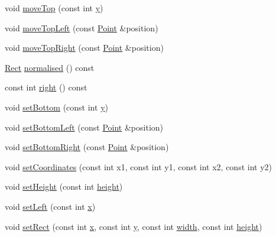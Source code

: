 \begin{DoxyCompactItemize}
\item 
void \hyperlink{classprism_1_1_rect_a1b1e4d524a29d32eab8c0938b6ae5246}{move\+Top} (const int \hyperlink{classprism_1_1_rect_a6e951744e0bba0fed781b86ab0be680b}{y})
\item 
void \hyperlink{classprism_1_1_rect_ae0ccad0d81dbda985be4e9ee8ae3f6f7}{move\+Top\+Left} (const \hyperlink{classprism_1_1_point}{Point} \&position)
\item 
void \hyperlink{classprism_1_1_rect_a24bdcf4de55d61b8c41010a8614203a7}{move\+Top\+Right} (const \hyperlink{classprism_1_1_point}{Point} \&position)
\item 
\hyperlink{classprism_1_1_rect}{Rect} \hyperlink{classprism_1_1_rect_ab08d9dbc02f86349530e0a2b6f6d05d6}{normalised} () const 
\item 
const int \hyperlink{classprism_1_1_rect_abf19c427e016b65d28118b8330de62d1}{right} () const 
\item 
void \hyperlink{classprism_1_1_rect_ac9d82a69be0dba946f8f9421aa33fffe}{set\+Bottom} (const int \hyperlink{classprism_1_1_rect_a6e951744e0bba0fed781b86ab0be680b}{y})
\item 
void \hyperlink{classprism_1_1_rect_a467b2b59e56d1aee949d9fb32681d559}{set\+Bottom\+Left} (const \hyperlink{classprism_1_1_point}{Point} \&position)
\item 
void \hyperlink{classprism_1_1_rect_a681ef54c0d6e0fac56394f15623c764f}{set\+Bottom\+Right} (const \hyperlink{classprism_1_1_point}{Point} \&position)
\item 
void \hyperlink{classprism_1_1_rect_ac930da7066defdd4646d801edc0b1cc0}{set\+Coordinates} (const int x1, const int y1, const int x2, const int y2)
\item 
void \hyperlink{classprism_1_1_rect_a0358cb30610f6bacde57613840bb5f4c}{set\+Height} (const int \hyperlink{classprism_1_1_rect_ad713f4536accdc6d5d2e6a6d83eac78b}{height})
\item 
void \hyperlink{classprism_1_1_rect_a58f42232724615d479b4cc3a08eeac01}{set\+Left} (const int \hyperlink{classprism_1_1_rect_a202fa9a56964c9111a968fb9b420f5f4}{x})
\item 
void \hyperlink{classprism_1_1_rect_a32978009107a8c2ea4787edde3960985}{set\+Rect} (const int \hyperlink{classprism_1_1_rect_a202fa9a56964c9111a968fb9b420f5f4}{x}, const int \hyperlink{classprism_1_1_rect_a6e951744e0bba0fed781b86ab0be680b}{y}, const int \hyperlink{classprism_1_1_rect_a8dae47a50fdac7a5f7e8aabef68437aa}{width}, const int \hyperlink{classprism_1_1_rect_ad713f4536accdc6d5d2e6a6d83eac78b}{height})
\item 

\end{DoxyCompactItemize}
